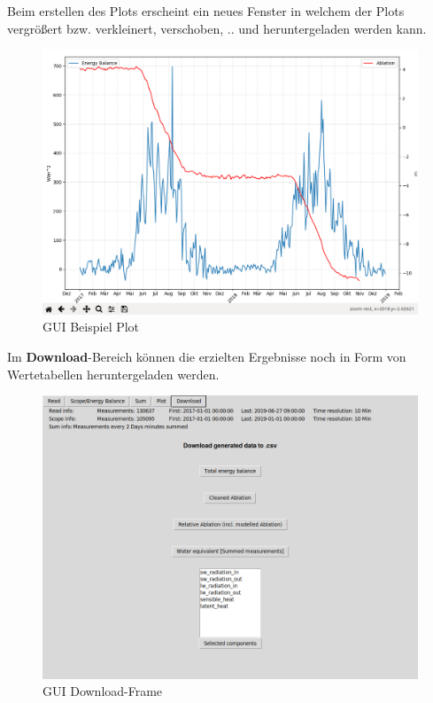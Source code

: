 \documentclass[12pt,a4paper]{article}
\begin{document}
Beim erstellen des Plots erscheint ein neues Fenster in welchem der Plots vergrößert bzw. verkleinert, verschoben, .. und heruntergeladen werden kann.

\begin{figure}[H]
\centering
\includegraphics[width=1\textwidth]{pictures/GUI/Sample_Plot.png}
\caption{GUI Beispiel Plot}
\label{fig:GUI Beispiel Plot}
\end{figure}

Im \textbf{Download}-Bereich können die erzielten Ergebnisse noch in Form von Wertetabellen heruntergeladen werden.

\begin{figure}[H]
\centering
\includegraphics[width=1\textwidth]{pictures/GUI/Download_Frame.png}
\caption{GUI Download-Frame}
\label{fig:GUI Download-Frame}
\end{figure}
\end{document}
